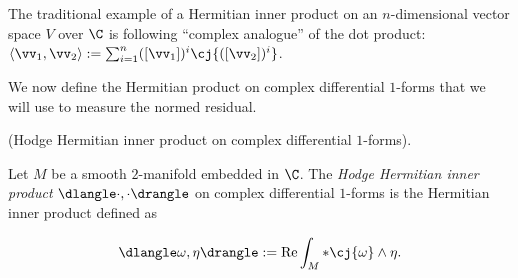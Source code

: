 \begin{example}
\label{ch::ddg::example::complex_dot_prod}
    The traditional example of a Hermitian inner product on an $n$-dimensional vector space $V$ over $\C$ is following ``complex analogue'' of the dot product: $\langle \vv_1, \vv_2 \rangle := \sum_{i = 1}^n ([\vv_1])^i \cj{([\vv_2])^i}$.
\end{example}

We now define the Hermitian product on complex differential $1$-forms that we will use to measure the normed residual.

\begin{defn}
    (Hodge Hermitian inner product on complex differential $1$-forms).
    
    Let $M$ be a smooth $2$-manifold embedded in $\C$. The \textit{Hodge Hermitian inner product} $\dlangle \cdot, \cdot \drangle$ on complex differential $1$-forms is the Hermitian inner product defined as
    
    \begin{align*}
        \dlangle \omega, \eta \drangle := \text{Re} \int_M *\cj{\omega} \wedge \eta.
    \end{align*}
\end{defn}

